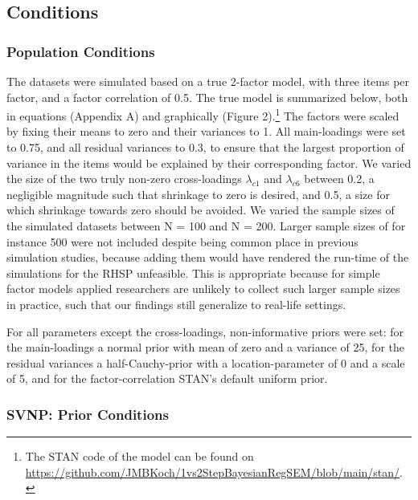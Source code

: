 \documentclass[]{interact}
\theoremstyle{plain}%
\theoremstyle{definition}
\theoremstyle{remark}
\begin{document}
\hypertarget{conditions}{%
\subsection{Conditions}\label{conditions}}

\hypertarget{population-conditions}{%
\subsubsection{Population Conditions}\label{population-conditions}}

The datasets were simulated based on a true 2-factor model, with three
items per factor, and a factor correlation of 0.5. The true model is
summarized below, both in equations (Appendix A) and graphically (Figure
2).\footnote{The STAN code of the model can be found on
  \url{https://github.com/JMBKoch/1vs2StepBayesianRegSEM/blob/main/stan/}.}
The factors were scaled by fixing their means to zero and their
variances to 1. All main-loadings were set to 0.75, and all residual
variances to 0.3, to ensure that the largest proportion of variance in
the items would be explained by their corresponding factor. We varied
the size of the two truly non-zero cross-loadings \(\lambda_{c 1}\) and
\(\lambda_{c 6}\) between 0.2, a negligible magnitude such that
shrinkage to zero is desired, and 0.5, a size for which shrinkage
towards zero should be avoided. We varied the sample sizes of the
simulated datasets between N = 100 and N = 200. Larger sample sizes of
for instance 500 were not included despite being common place in
previous simulation studies, because adding them would have rendered the
run-time of the simulations for the RHSP unfeasible. This is appropriate
because for simple factor models applied researchers are unlikely to
collect such larger sample sizes in practice, such that our findings
still generalize to real-life settings.

For all parameters except the cross-loadings, non-informative priors
were set: for the main-loadings a normal prior with mean of zero and a
variance of 25, for the residual variances a half-Cauchy-prior with a
location-parameter of 0 and a scale of 5, and for the factor-correlation
STAN's default uniform prior.

\hypertarget{svnp-prior-conditions}{%
\subsubsection{SVNP: Prior Conditions}\label{svnp-prior-conditions}}
\end{document}
